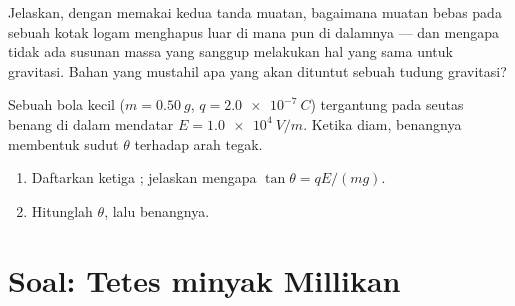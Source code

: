 \begin{exercise}[$\star\star\star$]\label{exo:g11:electric-gravitational-fields:14}
Jelaskan, dengan memakai kedua tanda muatan, bagaimana muatan bebas
pada sebuah kotak logam menghapus  luar di mana pun di
dalamnya --- dan mengapa tidak ada susunan massa yang sanggup melakukan
hal yang sama untuk gravitasi. Bahan yang mustahil apa yang akan
dituntut sebuah tudung gravitasi?
\end{exercise}

\begin{exercise}[$\star\star\star$]\label{exo:g11:electric-gravitational-fields:15}
Sebuah bola kecil ($m = \qty{0.50}{g}$, $q = \qty{+2.0e-7}{C}$)
tergantung pada seutas benang di dalam  mendatar
$E = \qty{1.0e4}{V/m}$. Ketika diam, benangnya membentuk sudut $\theta$
terhadap arah tegak.
\begin{enumerate}
  \item Daftarkan ketiga ; jelaskan mengapa
        $\tan\theta = qE / (mg)$.
  \item Hitunglah $\theta$, lalu  benangnya.
\end{enumerate}
\end{exercise}

\section{Soal: Tetes minyak Millikan}

